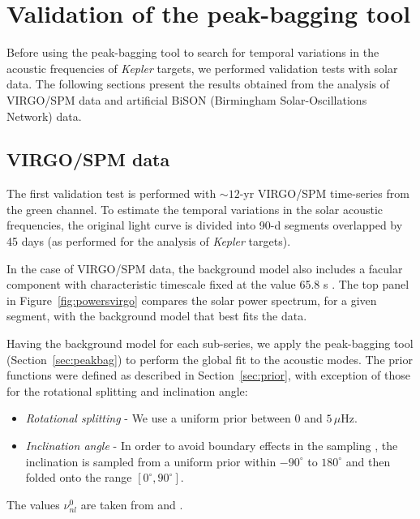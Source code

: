 \documentclass[twocolumn]{aastex61}%
\begin{document}

 

\appendix
\section{Validation of the peak-bagging tool}\label{sec:sun}

Before using the peak-bagging tool to search for temporal variations in the acoustic frequencies of {\it Kepler} targets, we performed validation tests with solar data.
The following sections present the results obtained from the analysis of VIRGO/SPM \citep[Variability of solar IRradiance and Gravity Oscillations on board SOlar and Heliospheric Observatory (SOHO), where SPM stands for sunphotometers;][]{Frohlich1995,Frohlich1997,Jimenez2002} data and artificial BiSON (Birmingham Solar-Oscillations Network) data.

\subsection{VIRGO/SPM data}\label{sec:virgo}

The first validation test is performed with $\sim12$-yr VIRGO/SPM time-series from the green channel. To estimate the temporal variations in the solar acoustic frequencies, the original light curve is divided into 90-d segments overlapped by 45 days (as performed for the analysis of {\it Kepler} targets).

In the case of VIRGO/SPM data, the background model also includes a facular component with characteristic timescale fixed at the value 65.8 s \citep{Karoff2012}. The top panel in Figure~\ref{fig:powersvirgo} compares the solar power spectrum, for a given segment, with the background model that best fits the data.

Having the background model for each sub-series, we apply the peak-bagging tool (Section~\ref{sec:peakbag}) to perform the global fit to the acoustic modes. The prior functions were defined as described in Section~\ref{sec:prior}, with exception of those for the rotational splitting and inclination angle:
\begin{itemize}
\item {\it Rotational splitting} - We use a uniform prior between $0$ and $5\,\mu\text{Hz}$.
\item {\it Inclination angle} - In order to avoid boundary effects in the sampling \citep[e.g.][]{Lund2014,Campante2016,Lund2017}, the inclination is sampled from a uniform prior within $-90^\circ$ to $180^\circ$ and then folded onto the range $[0^\circ,90^\circ]$. 
\end{itemize}
The values $\nu_{nl}^0$ are taken from \citet[for VIRGO/SPM data]{Stahn2010} and \citet[for BiSON data]{Broomhall2009}.
\end{document}
